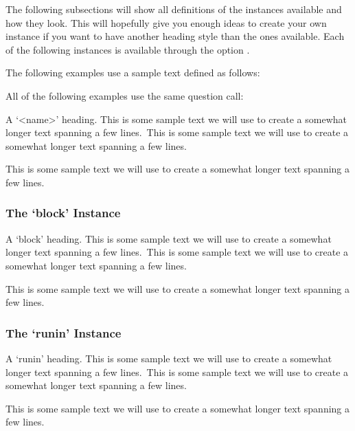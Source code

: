 \documentclass[load-preamble+,scrartcl={DIV10}]{cnltx-doc}
\begin{document}
The following subsections will show all definitions of the instances available
and how they look.  This will hopefully give you enough ideas to create your
own instance if you want to have another heading style than the ones
available.  Each of the following instances is available through the option
.

The following examples use a sample text defined as follows:
\begin{sourcecode}
  \def\s{This is some sample text we will use to create a somewhat
    longer text spanning a few lines.}
  \def\sample{\s\ \s\par\s}
\end{sourcecode}
\def\s{This is some sample text we will use to create a somewhat longer text
 spanning a few lines.}
\def\sample{\s\ \s\par\s}

All of the following examples use the same question call:
\begin{sourcecode}
  \begin{question}[subtitle=The subtitle of the question]{1}
    A `<name>' heading. \sample
  \end{question}
\end{sourcecode}

\subsubsection{The `block' Instance}
\begin{sourcecode}
\end{sourcecode}
\begin{question}[subtitle=The subtitle of the question]{1}
  A `block' heading. \sample
\end{question}

\newpage
\subsubsection{The `runin' Instance}
\begin{sourcecode}
\end{sourcecode}
\begin{question}[subtitle=The subtitle of the question]{1}
  A `runin' heading. \sample
\end{question}
\end{document}
